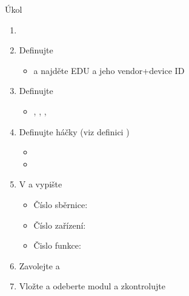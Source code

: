 \begin{frame}{Úkol}

  \begin{enumerate}
    \item {}

    \item Definujte 
    \begin{itemize}
      \item {} a najděte EDU a jeho vendor+device ID
    \end{itemize}

    \item Definujte 
    \begin{itemize}
      \item {}, , , 
    \end{itemize}

    \item Definujte háčky (viz definici )
    \begin{itemize}
      \item \scriptsize{}
      \item \scriptsize{}
    \end{itemize}

    \item V  a  vypište
    \begin{itemize}
      \item Číslo sběrnice: 
      \item Číslo zařízení: 
      \item Čislo funkce: 
    \end{itemize}

    \item Zavolejte  a 
    \item Vložte a odeberte modul a zkontrolujte 
  \end{enumerate}

\end{frame}

